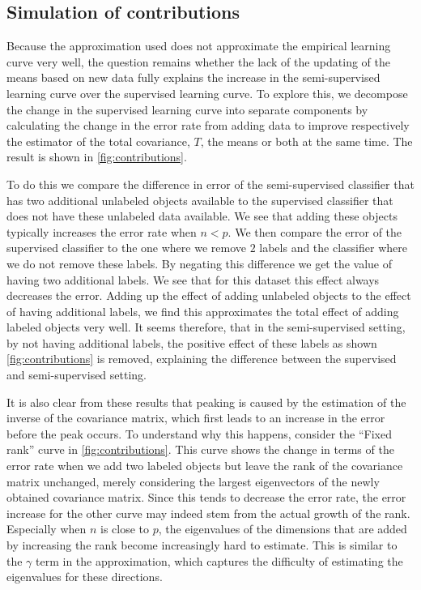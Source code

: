 \documentclass[runningheads,a4paper]{llncs}\usepackage[]{graphicx}\usepackage[]{color}
\begin{document}
\subsection{Simulation of contributions}
Because the approximation used does not approximate the empirical learning curve very well, the question remains whether the lack of the updating of the means based on new data fully explains the increase in the semi-supervised learning curve over the supervised learning curve. To explore this, we decompose the change in the supervised learning curve into separate components by calculating the change in the error rate from adding data to improve respectively the estimator of the total covariance, $T$, the means or both at the same time. The result is shown in \cref{fig:contributions}.

To do this we compare the difference in error of the semi-supervised classifier that has two additional unlabeled objects available to the supervised classifier that does not have these unlabeled data available. We see that adding these objects typically increases the error rate when $n<p$.  We then compare the error of the supervised classifier to the one where we remove $2$ labels and the classifier where we do not remove these labels. By negating this difference we get the value of having two additional labels. We see that for this dataset this effect always decreases the error.  Adding up the effect of adding unlabeled objects to the effect of having additional labels, we find this approximates the total effect of adding labeled objects very well. It seems therefore, that in the semi-supervised setting, by not having additional labels, the positive effect of these labels as shown \cref{fig:contributions} is removed, explaining the difference between the supervised and semi-supervised setting.

It is also clear from these results that peaking is caused by the estimation of the inverse of the covariance matrix, which first leads to an increase in the error before the peak occurs. To understand why this happens, consider the ``Fixed rank'' curve in \cref{fig:contributions}. This curve shows the change in terms of the error rate when we add two labeled objects but leave the rank of the covariance matrix unchanged, merely considering the largest eigenvectors of the newly obtained covariance matrix. Since this tends to decrease the error rate, the error increase for the other curve may indeed stem from the actual growth of the rank. Especially when $n$ is close to $p$, the eigenvalues of the dimensions that are added by increasing the rank become increasingly hard to estimate. This is similar to the $\gamma$ term in the approximation, which captures the difficulty of estimating the eigenvalues for these directions.
\end{document}
